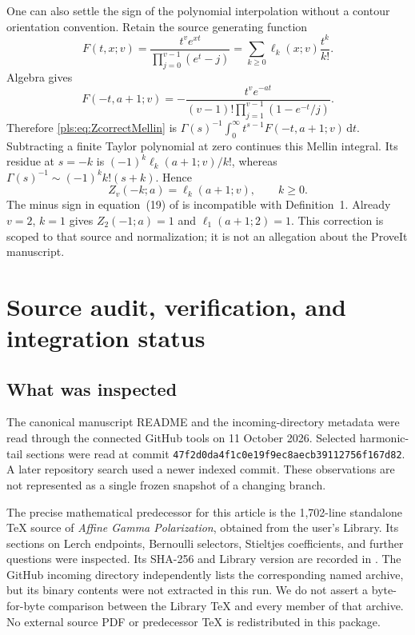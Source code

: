 \documentclass[11pt,letterpaper]{article}
\numberwithin{equation}{section}
\theoremstyle{definition}
\theoremstyle{remark}\newtheorem{remark}[theorem]{Remark}
\newcommand{\dd}{\,\mathrm d}
\newcommand{\src}[1]{\texttt{\detokenize{#1}}}
\begin{document}
One can also settle the sign of the polynomial interpolation without
a contour orientation convention. Retain the source generating
function
\begin{equation}\label{pls:eq:ellgen}
 F(t,x;v)=\frac{t^v e^{xt}}{\prod_{j=0}^{v-1}(e^t-j)}
           =\sum_{k\ge0}\ell_k(x;v)\frac{t^k}{k!}.
\end{equation}
Algebra gives
\[
 F(-t,a+1;v)=
 -\frac{t^v e^{-at}}{(v-1)!\prod_{j=1}^{v-1}(1-e^{-t}/j)}.
\]
Therefore \eqref{pls:eq:ZcorrectMellin} is
$\Gamma(s)^{-1}\int_0^\infty t^{s-1}F(-t,a+1;v)\dd t$.
Subtracting a finite Taylor polynomial at zero continues this Mellin
integral. Its residue at $s=-k$ is
$(-1)^k\ell_k(a+1;v)/k!$, whereas
$\Gamma(s)^{-1}\sim(-1)^k k!(s+k)$. Hence
\begin{equation}\label{pls:eq:correctinterpolation}
 \boxed{Z_v(-k;a)=\ell_k(a+1;v),\qquad k\ge0.}
\end{equation}
The minus sign in equation~(19) of \cite{PPS} is incompatible with
Definition~1. Already $v=2$, $k=1$ gives $Z_2(-1;a)=1$ and
$\ell_1(a+1;2)=1$. This correction is scoped to that source and
normalization; it is not an allegation about the ProveIt manuscript.

\section{Source audit, verification, and integration status}
\label{pls:sec:audit}

\subsection{What was inspected}

The canonical manuscript README and the incoming-directory metadata were
read through the connected GitHub tools on 11 October 2026. Selected
harmonic-tail sections were read at commit
\texttt{47f2d0da4f1c0e19f9ec8aecb39112756f167d82}.
A later repository search used a newer indexed commit. These observations
are not represented as a single frozen snapshot of a changing
\src{main} branch.

The precise mathematical predecessor for this article is the 1,702-line
standalone TeX source of \emph{Affine Gamma Polarization}, obtained from
the user's Library. Its sections on Lerch endpoints, Bernoulli selectors,
Stieltjes coefficients, and further questions were inspected. Its SHA-256
and Library version are recorded in \src{source_manifest.json}. The
GitHub incoming directory independently lists the corresponding named
archive, but its binary contents were not extracted in this run. We do
not assert a byte-for-byte comparison between the Library TeX and every
member of that archive. No external source PDF or predecessor TeX is
redistributed in this package.
\end{document}

